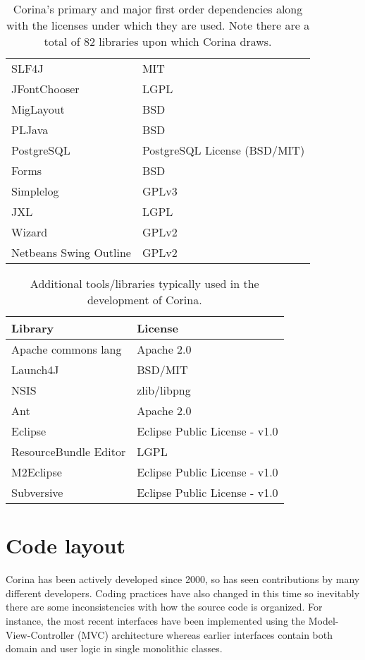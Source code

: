 \begin{table*}[htbp]
\begin{tabular*}{0.6\textwidth}{ll}
SLF4J & MIT\\
JFontChooser & LGPL\\
MigLayout & BSD\\
PLJava & BSD\\
PostgreSQL & PostgreSQL License (BSD/MIT)\\
Forms & BSD\\
Simplelog & GPLv3\\
JXL & LGPL\\
Wizard & GPLv2\\
Netbeans Swing Outline & GPLv2\\
\bottomrule
\end{tabular*}
\captionsetup{width=0.6\textwidth}
\caption{Corina's primary and major first order dependencies along with the licenses under which they are used.  Note there are a total of 82 libraries upon which Corina draws.}
\label{tbl:desktopDependencies}
\end{table*}


\begin{table*}[htbp]
\centering
\label{tbl:developDependencies}
\begin{tabular*}{0.6\textwidth}{ll}
\toprule
Library & License \\
\midrule
Apache commons lang & Apache 2.0 \\
Launch4J & BSD/MIT \\
NSIS & zlib/libpng \\
Ant & Apache 2.0 \\
Eclipse & Eclipse Public License - v1.0\\
ResourceBundle Editor & LGPL \\
M2Eclipse & Eclipse Public License - v1.0\\
Subversive & Eclipse Public License - v1.0\\
\bottomrule
\end{tabular*}
\captionsetup{width=0.6\textwidth}
\caption{Additional tools/libraries typically used in the development of Corina.}
\end{table*}

\section{Code layout}
Corina has been actively developed since 2000, so has seen contributions by many different developers.  Coding practices have also changed in this time so inevitably there are some inconsistencies with how the source code is organized.  For instance, the most recent interfaces have been implemented using the Model-View-Controller (MVC) architecture whereas earlier interfaces contain both domain and user logic in single monolithic classes.  

